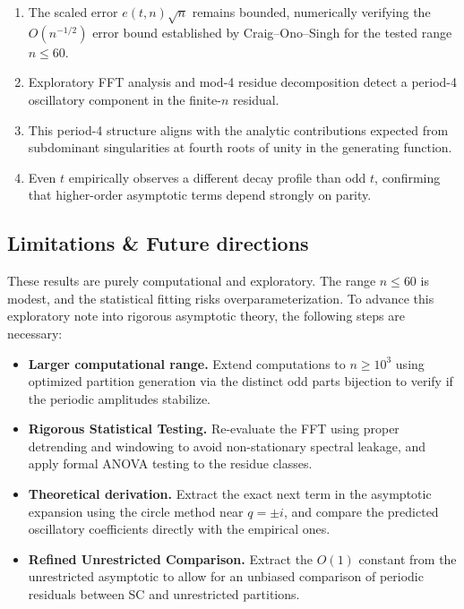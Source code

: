 \documentclass[11pt,reqno]{amsart}
\begin{document}
\begin{enumerate}
\item The scaled error $e(t,n)\sqrt{n}$ remains bounded, 
numerically verifying the $O(n^{-1/2})$ error bound established by 
Craig--Ono--Singh for the tested range $n \le 60$.

\item Exploratory FFT analysis and mod-4 residue decomposition 
detect a period-4 oscillatory component in the finite-$n$ residual.

\item This period-4 structure aligns with the analytic contributions 
expected from subdominant singularities at fourth roots of unity in the 
generating function.

\item Even $t$ empirically observes a different decay profile 
than odd $t$, confirming that higher-order asymptotic terms 
depend strongly on parity.
\end{enumerate}

\subsection{Limitations \& Future directions}

These results are purely computational and exploratory. 
The range $n \leq 60$ is modest, and the statistical fitting risks 
overparameterization. To advance this exploratory note into rigorous 
asymptotic theory, the following steps are necessary:

\begin{itemize}
\item \textbf{Larger computational range.} Extend computations 
to $n \geq 10^3$ using optimized partition generation via the distinct 
odd parts bijection to verify if the periodic amplitudes stabilize.

\item \textbf{Rigorous Statistical Testing.} Re-evaluate the FFT using 
proper detrending and windowing to avoid non-stationary spectral leakage, 
and apply formal ANOVA testing to the residue classes.

\item \textbf{Theoretical derivation.} Extract the exact next term in the 
asymptotic expansion using the circle method near $q = \pm i$, and compare the 
predicted oscillatory coefficients directly with the empirical ones.

\item \textbf{Refined Unrestricted Comparison.} Extract the $O(1)$ constant from the 
unrestricted asymptotic to allow for an unbiased comparison of periodic residuals 
between SC and unrestricted partitions.
\end{itemize}
\end{document}
